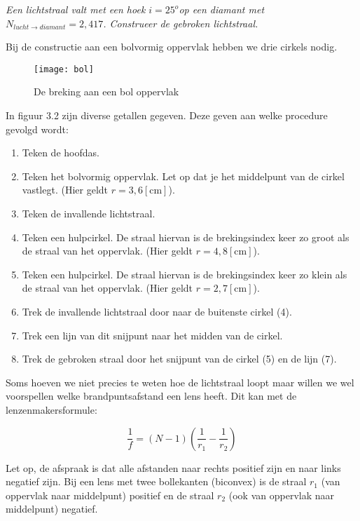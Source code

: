\emph{Een lichtstraal valt met een hoek $i=25^{o}$op een diamant
met $N_{lucht\rightarrow diamant}=2,417$. Construeer de gebroken
lichtstraal.\newpage{}}

Bij de constructie aan een bolvormig oppervlak hebben we drie cirkels
nodig.

\begin{figure}[H]
\noindent \begin{centering}
\texttt{[image: bol]}
\par\end{centering}

\caption{De breking aan een bol oppervlak}
\end{figure}


In figuur 3.2 zijn diverse getallen gegeven. Deze geven aan welke
procedure gevolgd wordt:
\begin{enumerate}
\item Teken de hoofdas.
\item Teken het bolvormig oppervlak. Let op dat je het middelpunt van de
cirkel vastlegt. (Hier geldt $r=3,6[\mathrm{cm}]$).
\item Teken de invallende lichtstraal.
\item Teken een hulpcirkel. De straal hiervan is de brekingsindex keer zo
groot als de straal van het oppervlak. (Hier geldt $r=4,8[\mathrm{cm}]$).
\item Teken een hulpcirkel. De straal hiervan is de brekingsindex keer zo
klein als de straal van het oppervlak. (Hier geldt $r=2,7[\mathrm{cm}]$).
\item Trek de invallende lichtstraal door naar de buitenste cirkel (4).
\item Trek een lijn van dit snijpunt naar het midden van de cirkel.
\item Trek de gebroken straal door het snijpunt van de cirkel (5) en de
lijn (7).
\end{enumerate}
Soms hoeven we niet precies te weten hoe de lichtstraal loopt maar
willen we wel voorspellen welke brandpuntsafstand een lens heeft.
Dit kan met de lenzenmakersformule:

\[
\frac{1}{f}=(N-1)(\frac{1}{r_{1}}-\frac{1}{r_{2}})
\]


Let op, de afspraak is dat alle afstanden naar rechts positief zijn
en naar links negatief zijn. Bij een lens met twee bollekanten (biconvex)
is de straal $r_{1}$ (van oppervlak naar middelpunt) positief en
de straal $r_{2}$ (ook van oppervlak naar middelpunt) negatief.\newpage{}

